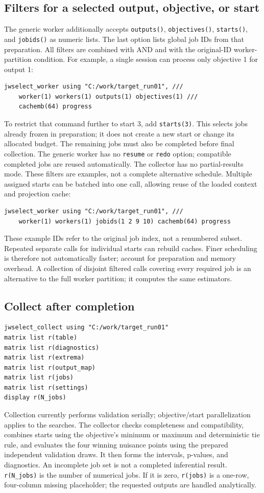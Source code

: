 \documentclass[11pt]{article}
\newcommand{\cmd}[1]{\texttt{#1}}
\begin{document}
\subsection{Filters for a selected output, objective, or start}
The generic worker additionally accepts \cmd{outputs()}, \cmd{objectives()},
\cmd{starts()}, and \cmd{jobids()} as numeric lists. The last option lists
global job IDs from that preparation. All filters are combined with AND and
with the original-ID worker-partition condition. For example, a single session can process
only objective 1 for output 1:
\begin{lstlisting}
jwselect_worker using "C:/work/target_run01", ///
    worker(1) workers(1) outputs(1) objectives(1) ///
    cachemb(64) progress
\end{lstlisting}
To restrict that command further to start 3, add \cmd{starts(3)}. This selects
jobs already frozen in preparation; it does not create a new start or change
its allocated budget. The remaining jobs must also be completed before final collection.
The generic worker has no \cmd{resume} or \cmd{redo} option; compatible
completed jobs are reused automatically. The collector has no partial-results
mode. These filters are examples, not a complete alternative schedule. Multiple assigned starts can be batched into one call, allowing
reuse of the loaded context and projection cache:
\begin{lstlisting}
jwselect_worker using "C:/work/target_run01", ///
    worker(1) workers(1) jobids(1 2 9 10) cachemb(64) progress
\end{lstlisting}
These example IDs refer to the original job index, not a renumbered subset.
Repeated separate calls for individual starts can rebuild caches. Finer scheduling is therefore
not automatically faster; account for preparation and memory overhead.
A collection of disjoint filtered calls covering every required job is an
alternative to the full worker partition; it computes the same estimators.

\subsection{Collect after completion}
\begin{lstlisting}
jwselect_collect using "C:/work/target_run01"
matrix list r(table)
matrix list r(diagnostics)
matrix list r(extrema)
matrix list r(output_map)
matrix list r(jobs)
matrix list r(settings)
display r(N_jobs)
\end{lstlisting}
Collection currently performs validation serially; objective/start
parallelization applies to the searches. The collector checks completeness
and compatibility, combines starts using
the objective's minimum or maximum and deterministic tie rule, and evaluates
the four winning nuisance points using the prepared independent validation
draws. It then forms the intervals, p-values, and diagnostics.
An incomplete job set is not a completed inferential result.
\cmd{r(N\_jobs)} is the number of numerical jobs. If it is zero,
\cmd{r(jobs)} is a one-row, four-column missing placeholder; the requested
outputs are handled analytically.
\end{document}
